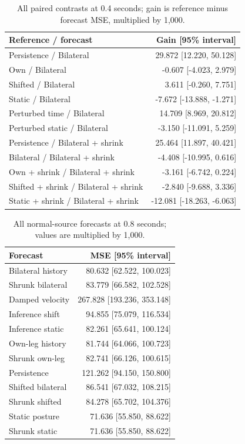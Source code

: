\documentclass[letterpaper]{article}
\begin{document}
\begin{table}[t]
\centering
\small
\begin{tabular}{lr}
\toprule
Reference / forecast & Gain [95\% interval] \\
\midrule
Persistence / Bilateral & 29.872 [12.220, 50.128] \\
Own / Bilateral & -0.607 [-4.023, 2.979] \\
Shifted / Bilateral & 3.611 [-0.260, 7.751] \\
Static / Bilateral & -7.672 [-13.888, -1.271] \\
Perturbed time / Bilateral & 14.709 [8.969, 20.812] \\
Perturbed static / Bilateral & -3.150 [-11.091, 5.259] \\
Persistence / Bilateral + shrink & 25.464 [11.897, 40.421] \\
Bilateral / Bilateral + shrink & -4.408 [-10.995, 0.616] \\
Own + shrink / Bilateral + shrink & -3.161 [-6.742, 0.224] \\
Shifted + shrink / Bilateral + shrink & -2.840 [-9.688, 3.336] \\
Static + shrink / Bilateral + shrink & -12.081 [-18.263, -6.063] \\
\bottomrule
\end{tabular}
\caption{All paired contrasts at 0.4 seconds; gain is reference minus forecast MSE, multiplied by 1,000.}
\end{table}

\begin{table}[t]
\centering
\small
\begin{tabular}{lr}
\toprule
Forecast & MSE [95\% interval] \\
\midrule
Bilateral history & 80.632 [62.522, 100.023] \\
Shrunk bilateral & 83.779 [66.582, 102.528] \\
Damped velocity & 267.828 [193.236, 353.148] \\
Inference shift & 94.855 [75.079, 116.534] \\
Inference static & 82.261 [65.641, 100.124] \\
Own-leg history & 81.744 [64.066, 100.723] \\
Shrunk own-leg & 82.741 [66.126, 100.615] \\
Persistence & 121.262 [94.150, 150.800] \\
Shifted bilateral & 86.541 [67.032, 108.215] \\
Shrunk shifted & 84.278 [65.702, 104.376] \\
Static posture & 71.636 [55.850, 88.622] \\
Shrunk static & 71.636 [55.850, 88.622] \\
\bottomrule
\end{tabular}
\caption{All normal-source forecasts at 0.8 seconds; values are multiplied by 1,000.}
\end{table}
\end{document}
